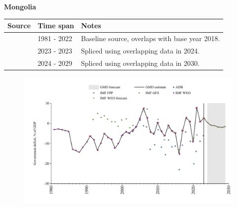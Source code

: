 \documentclass[12pt,a4paper,landscape]{article}
\begin{document}
\begin{adjustbox}{max totalsize={\paperwidth}{\paperheight},center}
\begin{minipage}[t][\textheight][t]{\textwidth}
\vspace*{0.5cm}
{}
\begin{center}
{\Large\bfseries Mongolia}
\end{center}
\vspace{0.5cm}
\begin{table}[H]
\centering
\small
\begin{tabular}{|l|l|l|}
\hline
\textbf{Source} & \textbf{Time span} & \textbf{Notes} \\
\hline
\rowcolor{white}\cite{IMF_WEO}& 1981 - 2022 &Baseline source, overlaps with base year 2018.\\
\rowcolor{lightgray}\cite{IMF_FPP}& 2023 - 2023 &Spliced using overlapping data in 2024.\\
\rowcolor{white}\cite{IMF_WEO_forecast}& 2024 - 2029 &Spliced using overlapping data in 2030.\\
\hline
\end{tabular}
\end{table}
\begin{figure}[H]
\centering
\includegraphics[width=\textwidth,height=0.6\textheight,keepaspectratio]{graphs/MNG_govdef_GDP.pdf}
\end{figure}
\end{minipage}
\end{adjustbox}
\end{document}
